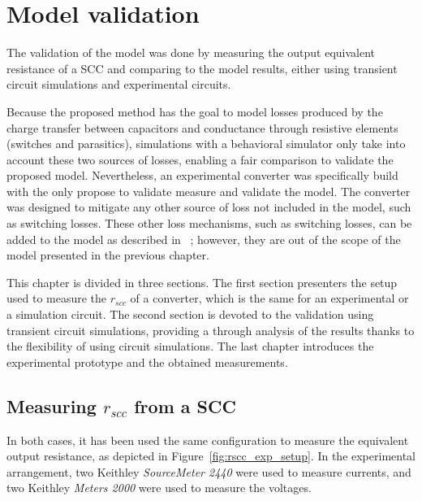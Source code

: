 \chapter{Model validation}
The validation of the model was done by measuring the output equivalent resistance of a SCC and comparing to the model results, either using transient circuit simulations and experimental circuits.

Because the proposed method has the goal to model losses produced by the charge transfer between capacitors and conductance through resistive elements (switches and parasitics), simulations with a behavioral simulator only take into account these two sources of losses, enabling a fair comparison to validate the proposed model.  Nevertheless, an experimental converter was specifically build with the only propose to validate measure and validate the model. The converter was designed to mitigate any other source of loss not included in the model, such as switching losses. These other loss mechanisms, such as switching losses, can be added to the model as described in ~\cite{Seeman:EECS-2009-78}; however, they are out of the scope of the model presented in the previous chapter.

This chapter is divided in three sections. The first section presenters the setup used to measure the $r_{scc}$ of a converter, which is the same for an experimental or a simulation circuit. The second section is devoted to the validation using transient circuit simulations, providing a through analysis of the results thanks to the flexibility of using circuit simulations. The last chapter introduces the experimental prototype and the obtained measurements.


\section{Measuring $r_{scc}$ from a SCC}
In both cases, it has been used the same configuration to measure the equivalent output resistance, as depicted in Figure~\ref{fig:rscc_exp_setup}. In the experimental arrangement, two Keithley\textsuperscript{\textregistered} \emph{SourceMeter 2440} were used to measure currents, and two Keithley\textsuperscript{\textregistered} \emph{Meters 2000} were used to measure the voltages.


